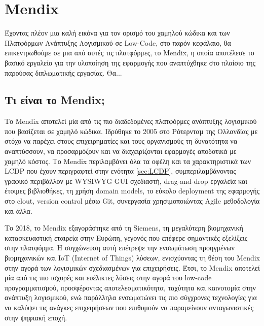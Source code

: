 \chapter{Mendix} \label{ch:mendix}
    Έχοντας πλέον μια καλή εικόνα για τον ορισμό του χαμηλού κώδικα και των Πλατφόρμων Ανάπτυξης Λογισμικού σε Low-Code, στο παρόν κεφάλαιο, θα επικεντρωθούμε σε μια από αυτές τις πλατφόρμες, το Mendix, η οποία αποτέλεσε το βασικό εργαλείο για την υλοποίηση της εφαρμογής που αναπτύχθηκε στο πλαίσιο της παρούσας διπλωματικής εργασίας. Θα...


    \section{Τι είναι το Mendix;}
        Το Mendix αποτελεί μία από τις πιο διαδεδομένες πλατφόρμες ανάπτυξης λογισμικού που βασίζεται σε χαμηλό κώδικα. Ιδρύθηκε το 2005 στο Ρότερνταμ της Ολλανδίας με στόχο να παρέχει στους επιχειρηματίες και τους οργανισμούς τη δυνατότητα να αναπτύσσουν, να προσαρμόζουν και να διαχειρίζονται εφαρμογές αποδοτικά με χαμηλό κόστος. Το Mendix περιλαμβάνει όλα τα οφέλη και τα χαρακτηριστικά των LCDP που έχουν περιγραφτεί στην ενότητα \ref{sec:LCDP}, συμπεριλαμβάνοντας γραφικό περιβάλλον με WYSIWYG GUI σχεδιαστή, drag-and-drop εργαλεία και έτοιμες βιβλιοθήκες, τη χρήση domain models, το εύκολο deployment της εφαρμογής στο clout, version control μέσω Git, συνεργασία χρησιμοποιώντας Agile μεθοδολογία και άλλα.

        Το 2018, το Mendix εξαγοράστηκε από τη Siemens, τη μεγαλύτερη βιομηχανική κατασκευαστική εταιρεία στην Ευρώπη, γεγονός που επέφερε σημαντικές εξελίξεις στην πλατφόρμα. Η συγχώνευση αυτή επέτρεψε την ενσωμάτωση προηγμένων βιομηχανικών και IoT (Internet of Things) λύσεων, ενισχύοντας τη θέση του Mendix στην αγορά των λογισμικών σχεδιασμένων για επιχειρήσεις. Έτσι, το Mendix αποτελεί μία από τις πιο ισχυρές και ευέλικτες λύσεις στην αγορά του low-code προγραμματισμού, προσφέροντας αποτελεσματικότητα, ταχύτητα και καινοτομία στην ανάπτυξη λογισμικού, ενώ παράλληλα ενσωματώνει τις πιο σύγχρονες τεχνολογίες για να καλύψει τις ανάγκες επιχειρήσεων που επιθυμούν να παραμείνουν ανταγωνιστικές στην ψηφιακή εποχή. \cite{LowCodeMendix}


